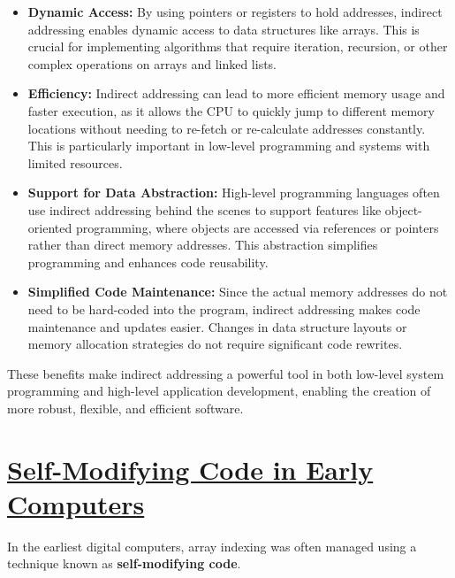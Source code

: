 \documentclass{book}
\begin{document}
\begin{itemize}
\begin{itemize}
\begin{itemize}
			\item \textbf{Dynamic Access:} By using pointers or registers to hold addresses, indirect addressing enables dynamic access to data structures like arrays. This is crucial for implementing algorithms that require iteration, recursion, or other complex operations on arrays and linked lists.
			
			\item \textbf{Efficiency:} Indirect addressing can lead to more efficient memory usage and faster execution, as it allows the CPU to quickly jump to different memory locations without needing to re-fetch or re-calculate addresses constantly. This is particularly important in low-level programming and systems with limited resources.
			
			\item \textbf{Support for Data Abstraction:} High-level programming languages often use indirect addressing behind the scenes to support features like object-oriented programming, where objects are accessed via references or pointers rather than direct memory addresses. This abstraction simplifies programming and enhances code reusability.
			
			\item \textbf{Simplified Code Maintenance:} Since the actual memory addresses do not need to be hard-coded into the program, indirect addressing makes code maintenance and updates easier. Changes in data structure layouts or memory allocation strategies do not require significant code rewrites.
		\end{itemize}
		These benefits make indirect addressing a powerful tool in both low-level system programming and high-level application development, enabling the creation of more robust, flexible, and efficient software.
	\end{itemize}
\end{itemize}


\section{\href{https://en.wikipedia.org/wiki/Self-modifying_code}{Self-Modifying Code in Early Computers}}
	
	In the earliest digital computers, array indexing was often managed using a technique known as \textbf{self-modifying code}.
	
\end{document}
